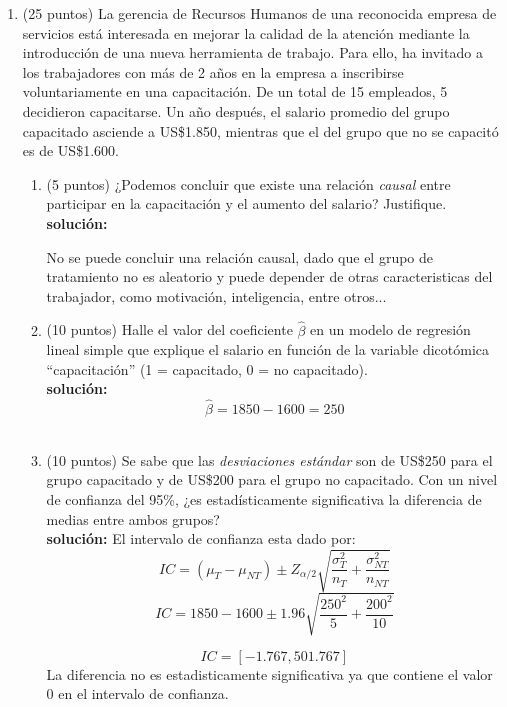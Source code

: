 \documentclass[10pt,a4paper]{article}
\begin{document}
\begin{enumerate}
    \item (25 puntos) La gerencia de Recursos Humanos de una reconocida empresa de servicios está interesada en mejorar la calidad de la atención mediante la introducción de una nueva herramienta de trabajo. Para ello, ha invitado a los trabajadores con más de 2 años en la empresa a inscribirse voluntariamente en una capacitación. De un total de 15 empleados, 5 decidieron capacitarse. Un año después, el salario promedio del grupo capacitado asciende a US\$1.850, mientras que el del grupo que no se capacitó es de US\$1.600.

\begin{enumerate}
    \item  (5 puntos) ¿Podemos concluir que existe una relación \textit{causal} entre participar en la capacitación y el aumento del salario? Justifique. \\

    \textbf{solución:}

    No se puede concluir una relación causal, dado que el grupo de tratamiento no es aleatorio y puede depender de otras caracteristicas del trabajador, como motivación, inteligencia, entre otros... \\

    \item  (10 puntos) Halle el valor del coeficiente $\hat{\beta}$ en un modelo de regresión lineal simple que explique el salario en función de la variable dicotómica ``capacitación'' (1 = capacitado, 0 = no capacitado). \\

    \textbf{solución:}
    $$\hat{\beta} = 1850-1600 = 250$$
    \\
    
    \item (10 puntos) Se sabe que las \textit{desviaciones estándar} son de US\$250 para el grupo capacitado y de US\$200 para el grupo no capacitado. Con un nivel de confianza del 95\%, ¿es estadísticamente significativa la diferencia de medias entre ambos grupos? \\

    \textbf{solución:}
    El intervalo de confianza esta dado por:
    $$IC = (\mu_T - \mu_{NT}) \pm Z_{\alpha/2}\sqrt{\frac{\sigma_T^2}{n_T}+\frac{\sigma^2_{NT}}{n_{NT}}}$$
    $$IC = 1850-1600\pm 1.96\sqrt{\frac{250^2}{5}+\frac{200^2}{10}}$$

    $$IC = [ -1.767 , 501.767]$$
    La diferencia no es estadisticamente significativa ya que contiene el valor 0 en el intervalo de confianza.
\\
    

\end{enumerate}
\end{enumerate}
\end{document}

